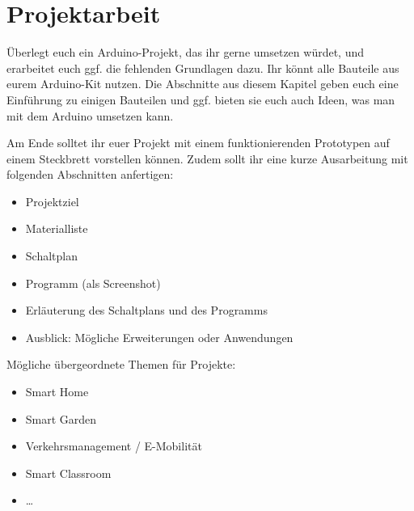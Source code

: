 

\newpage
\section{Projektarbeit}\label{sec:projektarbeit}

\begin{ziel}
	Überlegt euch ein Arduino-Projekt, das ihr gerne umsetzen würdet, und erarbeitet euch ggf. die fehlenden Grundlagen dazu. Ihr könnt alle Bauteile aus eurem Arduino-Kit nutzen. Die Abschnitte aus diesem Kapitel geben euch eine Einführung zu einigen Bauteilen und ggf. bieten sie euch auch Ideen, was man mit dem Arduino umsetzen kann.
	
	Am Ende solltet ihr euer Projekt mit einem funktionierenden Prototypen auf einem Steckbrett vorstellen können. Zudem sollt ihr eine kurze Ausarbeitung mit folgenden Abschnitten anfertigen:
	\begin{multicols}{2}
		\begin{itemize}[parsep=0mm, itemsep=0ex]
			\item Projektziel
			\item Materialliste
			\item Schaltplan
			\item Programm (als Screenshot)
			\item Erläuterung des Schaltplans und des Programms
			\item Ausblick: Mögliche Erweiterungen oder Anwendungen
		\end{itemize}
	\end{multicols}
\end{ziel}

Mögliche übergeordnete Themen für Projekte:
\begin{itemize}
	\item Smart Home
	\item Smart Garden
	\item Verkehrsmanagement / E-Mobilität
	\item Smart Classroom
	\item \dots
\end{itemize}